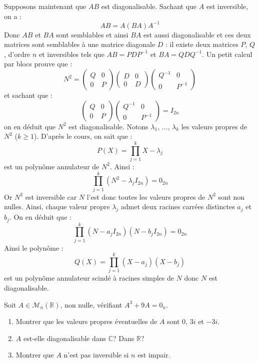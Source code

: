 \documentclass[a4paper,10pt]{report}
\begin{document}
\begin{enumerate}
\noindent Supposons maintenant que $AB$ est diagonalisable. Sachant que $A$ est inversible, on a :
$$ AB=A(BA)A^{-1}$$
Donc $AB$ et $BA$ sont semblables et ainsi $BA$ est aussi diagonalisable et ces deux matrices sont semblables à une matrice diagonale $D$ : il existe deux matrices $P$, $Q$, d'ordre $n$ et inversibles tels que $AB=PDP^{-1}$ et $BA= QDQ^{-1}$. Un petit calcul par blocs prouve que :
$$ N^2 = \begin{pmatrix}
Q & 0 \\
0 & P
\end{pmatrix} \begin{pmatrix}
D & 0 \\
0 & D
\end{pmatrix} \begin{pmatrix}
Q^{-1} & 0 \\
0 & P^{-1}
\end{pmatrix}$$
et sachant que :
$$ \begin{pmatrix}
Q & 0 \\
0 & P
\end{pmatrix} \begin{pmatrix}
Q^{-1} & 0 \\
0 & P^{-1}
\end{pmatrix} = I_{2n}$$
on en déduit que $N^2$ est diagonalisable. Notons $\lambda_1$, $\ldots$, $\lambda_k$ les valeurs propres de $N^2$ ($k \geq 1$). D'après le cours, on sait que :
$$ P(X) = \prod_{j=1}^k X- \lambda_j$$
est un polynôme annulateur de $N^2$. Ainsi :
$$ \prod_{j=1} ^k (N^2- \lambda_j I_{2n}) = 0_{2n}$$
Or $N^2$ est inversible car $N$ l'est donc toutes les valeurs propres de $N^2$ sont non nulles. Ainsi, chaque valeur propre $\lambda_j$ admet deux racines carrées distinctes $a_j$ et $b_j$. On en déduit que :
$$ \prod_{j=1} ^k (N- a_j I_{2n})(N - b_j I_{2n}) = 0_{2n}$$
Ainsi le polynôme :
$$ Q(X) = \prod_{j=1}^k (X-a_j)(X- b_j)$$
est un polynôme annulateur scindé à racines simples de $N$ donc $N$ est diagonalisable.
\end{enumerate}

\begin{Exa} Soit $A \in \mathcal{M}_n(\mathbb{R})$, non nulle, vérifiant $A^3+9A=0_n$.
\begin{enumerate}
\item Montrer que les valeurs propres éventuelles de $A$ sont $0$, $3i$ et $-3i$.
\item $A$ est-elle diagonalisable dans $\mathbb{C}$? Dans $\mathbb{R}$?
\item Montrer que $A$ n'est pas inversible si $n$ est impair. 
\end{enumerate}
\end{Exa}
\end{document}
